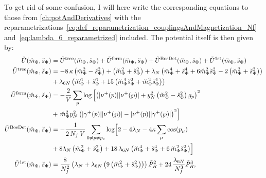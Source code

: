 To get rid of some confusion, I will here write the corresponding equations to those from \ref{ch:potAndDerivatives} with the 
reparametrizations~\eqref{eq:def_reparametrization_couplingsAndMagnetization_Nf} and~\eqref{eq:lambda_6_reparametrized} included. The potential itself is then given by:
\begin{align}\label{eq:CEP_shortCut_rescaled}
 \tilde U(\breve m_{\Phi}, \breve s_{\Phi}) &= 
                            \tilde U^{\text{tree}}(\breve m_{\Phi}, \breve s_{\Phi}) + \tilde U^{\text{ferm}}(\breve m_{\Phi}, \breve s_{\Phi})
                          + \tilde U^{\text{BosDet}}(\breve m_{\Phi}, \breve s_{\Phi}) + \tilde U^{\text{1st}}(\breve m_{\Phi}, \breve s_{\Phi})
%                           
              \\ \label{CEP_treeLevel_rescaled}
 \tilde U^{\text{tree}}(\breve m_{\Phi}, \breve s_{\Phi}) & = 
                          - 8\, \kappa \left( \breve m_{\Phi}^2 - \breve s_{\Phi}^2 \right)   +   \left( \breve m_{\Phi}^2 + \breve s_{\Phi}^2 \right)
                          + \lambda_N \left( \breve m_{\Phi}^4 + \breve s_{\Phi}^4 + 6 \breve m_{\Phi}^2 \breve s_{\Phi}^2 
                          - 2 \left(\breve m_{\Phi}^2 + \breve s_{\Phi}^2 \right) \right) 
              \nonumber \\
                        & + \lambda_{6N} \left( \breve m_{\Phi}^6 + \breve s_{\Phi}^6 + 15 \left( \breve m_{\Phi}^4 \breve s_{\Phi}^2 
                          + \breve m_{\Phi}^2 \breve s_{\Phi}^4 \right)   \right)
%                           
              \\ \label{eq:CEP_ferionicContribution_rescaled}
 \tilde U^{\text{ferm}}(\breve m_{\Phi}, \breve s_{\Phi}) & = 
                          - \frac{2}{V} \sum\limits_p \log \left[ \left( |\nu^+(p)| |\nu^+(\wp)|   +
                           y_N^2 \left( \breve m_{\Phi}^2 - \breve s_{\Phi}^2 \right) g_p\right)^2  \right.
               \nonumber \\ 
                        & + \left. \breve m_{\Phi}^2 y_N^2 \left( |\gamma^+(p)| |\nu^+(\wp)|   -   |\nu^+(p)| |\gamma^+(\wp)| \right)^2\right] 
%                         
               \\ \label{eq:CEP_bosonicDeterminantContribution_rescaled}
 \tilde U^{\text{BosDet}}(\breve m_{\Phi}, \breve s_{\Phi}) & = 
                          - \frac{1}{2\,N_f\,V}\sum\limits_{0 \neq p \neq p_s} 
                            \log\Bigl[ 2 - 4 \lambda_N - 4 \kappa \sum_{\mu} \cos(p_{\mu})
               \nonumber \\
                        & + 8 \lambda_N \left( \breve m_{\Phi}^2 + \breve s_{\Phi}^2  \right) 
                          + 18\, \lambda_{6N}\left( \breve m_{\Phi}^4 + \breve s_{\Phi}^4 + 6\,  \breve m_{\Phi}^2 \breve s_{\Phi}^2 \right)\Bigr]
%                           
               \\ \label{eq:CEP_bosonicFirstOrderContribution_rescaled}
 \tilde U^{\text{1st}}(\breve m_{\Phi}, \breve s_{\Phi}) & = 
                            \frac{8}{N_f^2} \left( \lambda_N + \lambda_{6N} \left( 
                            9 \left( \breve m_{\Phi}^2 + \breve s_{\Phi}^2 \right) \right) \right) \tilde P_B^2 + 24\,\frac{\lambda_{6N}}{N_f^3} \tilde P_B^3,
\end{align}


